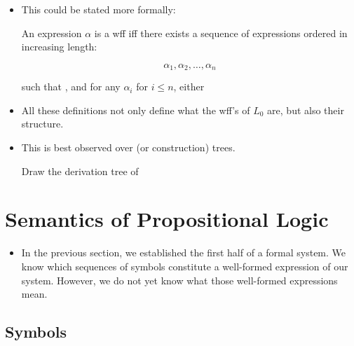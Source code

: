 \documentclass[11pt]{article}
\begin{document}
\begin{itemize}
\item This could be stated more formally:

 \hrulefill
 \begin{udefinition}[$L_0$, ``bottom-up'']
 An expression $\alpha$ is a wff iff there exists a sequence of expressions
 ordered in increasing length:

\[
 \alpha_1,\alpha_2,\ldots,\alpha_n
\]

such that , and for any $\alpha_i$ for $i\leq n$, either
 \end{udefinition}
 \hrulefill

\item All these definitions not only define what the wff's of $L_0$ are, but
also their structure.

\item This is best observed over  (or construction) trees.

\begin{uexample}
Draw the derivation tree of 
\end{uexample}

\end{itemize}

\section{Semantics of Propositional Logic}

\begin{itemize}

\item In the previous section, we established the first half of a formal system.
We know which sequences of symbols constitute a well-formed expression of our
system. However, we do not yet know what those well-formed expressions mean. 

\end{itemize}

\subsection{Symbols}
\end{document}
